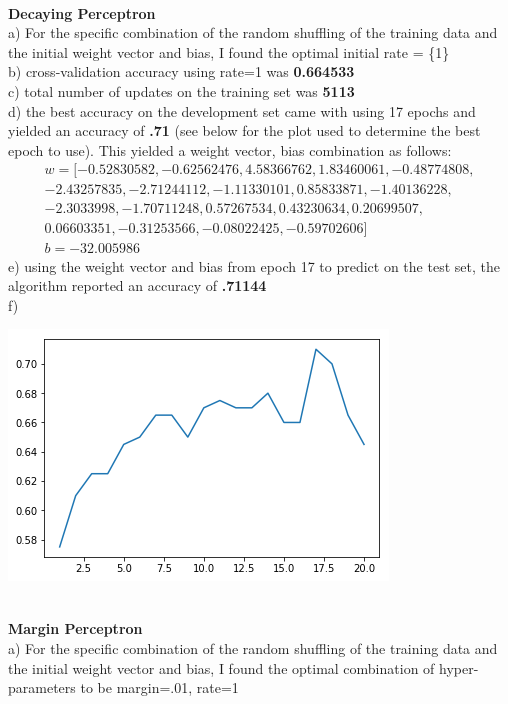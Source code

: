 \documentclass[11pt,a4paper]{article}
\begin{document}
\begin{enumerate}
\begin{center}
			\end{center}
			~\\
			\textbf{Decaying Perceptron}    \\
			a) For the specific combination of the random shuffling of the training data and the initial weight vector and bias, I found the optimal initial rate = \{1\}  \\
			b) cross-validation accuracy using rate=1 was \textbf{0.664533}\\
			c) total number of updates on the training set was \textbf{5113}\\
			d) the best accuracy on the development set came with using 17 epochs and yielded an accuracy of \textbf{.71} (see below for the plot used to determine the best epoch to use). This yielded a weight vector, bias combination as follows:\\
			\begin{gather}
			w = [-0.52830582, -0.62562476,  4.58366762,  1.83460061, -0.48774808,\\
			-2.43257835, -2.71244112, -1.11330101,  0.85833871, -1.40136228,\\
			-2.3033998 , -1.70711248,  0.57267534,  0.43230634,  0.20699507,\\
			0.06603351, -0.31253566, -0.08022425, -0.59702606] \\
			b = -32.005986
			\end{gather}
			e) using the weight vector and bias from epoch 17 to predict on the test set, the algorithm reported an accuracy of \textbf{.71144} \\
			f)
			\begin{center}
				\includegraphics[width=0.7\linewidth]{decaying_plot}
			\end{center}
			~\\
			\textbf{Margin Perceptron}    \\
			a) For the specific combination of the random shuffling of the training data and the initial weight vector and bias, I found the optimal combination of hyper-parameters to be margin=.01, rate=1  \\

\end{enumerate}
\end{document}
